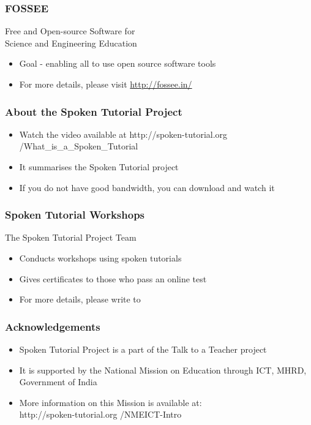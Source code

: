 \documentclass[17pt,compress]{beamer}
\begin{document}
\begin{frame}
\frametitle{FOSSEE}
{\color{blue}Free and Open-source Software for \\Science and Engineering Education} \\
\begin{itemize}
\item Goal - enabling all to use open source software tools
\item For more details, please visit {\color{blue}\url{http://fossee.in/}}
\end{itemize}
\end{frame}
\begin{frame}
\frametitle{About the Spoken Tutorial Project}
\begin{itemize}
\item Watch the video available at {\color{blue}http://spoken-tutorial.org /What\_is\_a\_Spoken\_Tutorial}
\item It summarises the Spoken Tutorial project \pause
\item If you do not have good bandwidth, you can download and watch it
\end{itemize}
\end{frame}
\begin{frame}
\frametitle{Spoken Tutorial Workshops}The Spoken Tutorial Project Team 
\begin{itemize}
\item Conducts workshops using spoken tutorials 
\item Gives certificates to those who pass an online test 
\item For more details, please write to \\ 
\end{itemize}
\end{frame}
\begin{frame}
\frametitle{Acknowledgements}
\begin{itemize}
\item Spoken Tutorial Project is a part of the Talk to a Teacher  project 
\item It is supported by the National Mission on Education through  ICT, MHRD, Government of India 
\item More information on this Mission is available at: \\{\color{blue}http://spoken-tutorial.org /NMEICT-Intro}
\end{itemize}
\end{frame}
\end{document}

